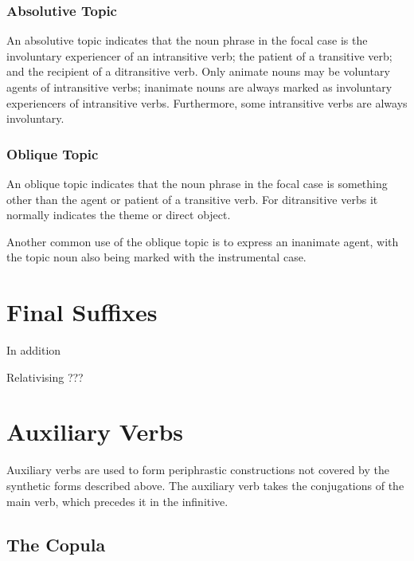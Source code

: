 \documentclass[grammar]{subfiles}
\begin{document}
  \subsubsection{Absolutive Topic}
  \label{sssec:vm_abs_topic}

  An absolutive topic indicates that the noun phrase in the focal case is the
  involuntary experiencer of an intransitive verb; the patient of a transitive
  verb; and the recipient of a ditransitive verb.  Only animate nouns may be
  voluntary agents of intransitive verbs; inanimate nouns are always marked as
  involuntary experiencers of intransitive verbs.  Furthermore, some
  intransitive verbs are always involuntary. 

  \subsubsection{Oblique Topic}
  \label{sssec:vm_obl_topic}

  An oblique topic indicates that the noun phrase in the focal case is something
  other than the agent or patient of a transitive verb.  For ditransitive verbs
  it normally indicates the theme or direct object.

  Another common use of the oblique topic is to express an inanimate agent,
  with the topic noun also being marked with the instrumental case. 

  \section{Final Suffixes}
  \label{sec:vm_final_suffixes}

  In addition

  \ToBeWritten Relativising ???

  \newpage
  \section{Auxiliary Verbs}
  \label{sec:vm_auxiliary}
  
  Auxiliary verbs are used to form periphrastic constructions not covered by
  the synthetic forms described above.  The auxiliary verb takes the
  conjugations of the main verb, which precedes it in the infinitive.  

  \subsection{The Copula}
  \label{ssec:vm_copula}
\end{document}
